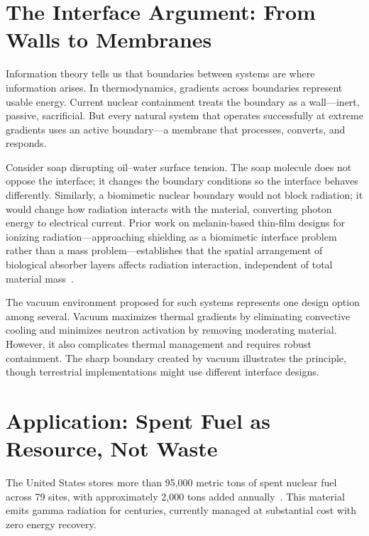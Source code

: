 \documentclass[12pt]{article}
\begin{document}
\section{The Interface Argument: From Walls to Membranes}

Information theory tells us that boundaries between systems are where information arises.
In thermodynamics, gradients across boundaries represent usable energy. Current nuclear
containment treats the boundary as a wall---inert, passive, sacrificial. But every
natural system that operates successfully at extreme gradients uses an active
boundary---a membrane that processes, converts, and responds.

Consider soap disrupting oil--water surface tension. The soap molecule does not oppose
the interface; it changes the boundary conditions so the interface behaves differently.
Similarly, a biomimetic nuclear boundary would not block radiation; it would change how
radiation interacts with the material, converting photon energy to electrical current.
Prior work on melanin-based thin-film designs for ionizing radiation---approaching
shielding as a biomimetic interface problem rather than a mass problem---establishes that
the spatial arrangement of biological absorber layers affects radiation interaction,
independent of total material mass~\cite{vasileiou2020}.

The vacuum environment proposed for such systems represents one design option among
several. Vacuum maximizes thermal gradients by eliminating convective cooling and
minimizes neutron activation by removing moderating material. However, it also
complicates thermal management and requires robust containment. The sharp boundary
created by vacuum illustrates the principle, though terrestrial implementations might
use different interface designs.

\section{Application: Spent Fuel as Resource, Not Waste}

The United States stores more than 95{,}000 metric tons of spent nuclear fuel across 79
sites, with approximately 2{,}000 tons added annually~\cite{doe2025}. This material emits
gamma radiation for centuries, currently managed at substantial cost with zero energy
recovery.
\end{document}
